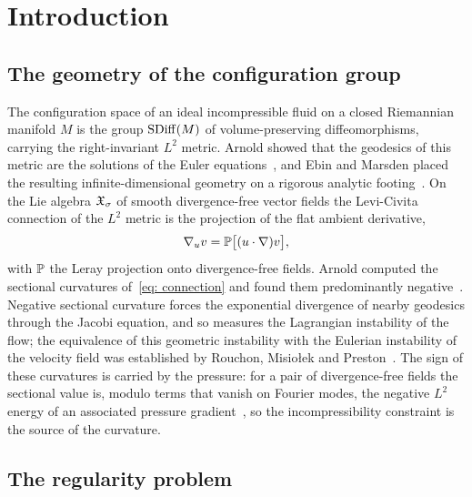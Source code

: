 \section{Introduction}
\label{sec: introduction}

\subsection{The geometry of the configuration group}

The configuration space of an ideal incompressible fluid on a closed Riemannian
manifold $M$ is the group $\operatorname{SDiff}(M)$ of volume-preserving diffeomorphisms,
carrying the right-invariant $L^2$ metric. Arnold showed that the geodesics of
this metric are the solutions of the Euler equations~\cite{arnold-1966-sur-la-geo},
and Ebin and Marsden placed the resulting infinite-dimensional geometry on a
rigorous analytic footing~\cite{ebin-1970-gro-dif-mot}. On the Lie algebra
$\mathfrak{X}_\sigma$ of smooth divergence-free vector fields the Levi-Civita connection of the
$L^2$ metric is the projection of the flat ambient derivative,
\begin{equation}\label{eq: connection}
  \nabla_u v = \mathbb{P}\bigl[(u\cdot\nabla)v\bigr],
\end{equation}
with $\mathbb{P}$ the Leray projection onto divergence-free fields. Arnold computed
the sectional curvatures of~\eqref{eq: connection} and found them predominantly
negative~\cite{arnold-1966-sur-la-geo, arnold-1998-top-met-hyd}. Negative
sectional curvature forces the exponential divergence of nearby geodesics through
the Jacobi equation, and so measures the Lagrangian instability of the flow; the
equivalence of this geometric instability with the Eulerian instability of the
velocity field was established by Rouchon, Misio\l{}ek and
Preston~\cite{rouchon-1992-jac-cur, misiolek-1993-sta-flo-ide,
preston-2004-ide-flu-ins}. The sign of these curvatures is carried by the
pressure: for a pair of divergence-free fields the sectional value is, modulo
terms that vanish on Fourier modes, the negative $L^2$ energy of an associated
pressure gradient~\cite{arnold-1998-top-met-hyd}, so the incompressibility
constraint is the source of the curvature.

\subsection{The regularity problem}

